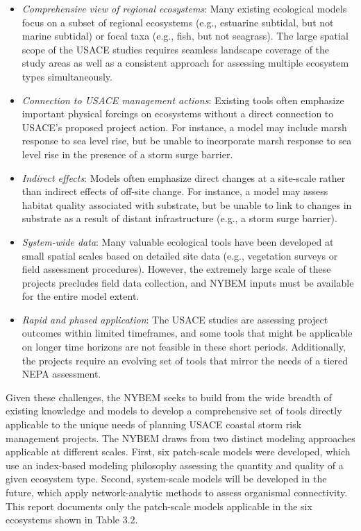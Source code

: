 \documentclass[
]{book}
\providecommand{\tightlist}{%
  \setlength{\itemsep}{0pt}\setlength{\parskip}{0pt}}
\begin{document}
\begin{itemize}
\tightlist
\item
  \emph{Comprehensive view of regional ecosystems}: Many existing ecological models focus on a subset of regional ecosystems (e.g., estuarine subtidal, but not marine subtidal) or focal taxa (e.g., fish, but not seagrass). The large spatial scope of the USACE studies requires seamless landscape coverage of the study areas as well as a consistent approach for assessing multiple ecosystem types simultaneously.\\
\item
  \emph{Connection to USACE management actions}: Existing tools often emphasize important physical forcings on ecosystems without a direct connection to USACE's proposed project action. For instance, a model may include marsh response to sea level rise, but be unable to incorporate marsh response to sea level rise in the presence of a storm surge barrier.\\
\item
  \emph{Indirect effects}: Models often emphasize direct changes at a site-scale rather than indirect effects of off-site change. For instance, a model may assess habitat quality associated with substrate, but be unable to link to changes in substrate as a result of distant infrastructure (e.g., a storm surge barrier).\\
\item
  \emph{System-wide data}: Many valuable ecological tools have been developed at small spatial scales based on detailed site data (e.g., vegetation surveys or field assessment procedures). However, the extremely large scale of these projects precludes field data collection, and NYBEM inputs must be available for the entire model extent.\\
\item
  \emph{Rapid and phased application}: The USACE studies are assessing project outcomes within limited timeframes, and some tools that might be applicable on longer time horizons are not feasible in these short periods. Additionally, the projects require an evolving set of tools that mirror the needs of a tiered NEPA assessment.
\end{itemize}

Given these challenges, the NYBEM seeks to build from the wide breadth of existing knowledge and models to develop a comprehensive set of tools directly applicable to the unique needs of planning USACE coastal storm risk management projects. The NYBEM draws from two distinct modeling approaches applicable at different scales. First, six patch-scale models were developed, which use an index-based modeling philosophy assessing the quantity and quality of a given ecosystem type. Second, system-scale models will be developed in the future, which apply network-analytic methods to assess organismal connectivity. This report documents only the patch-scale models applicable in the six ecosystems shown in Table 3.2.
\end{document}
